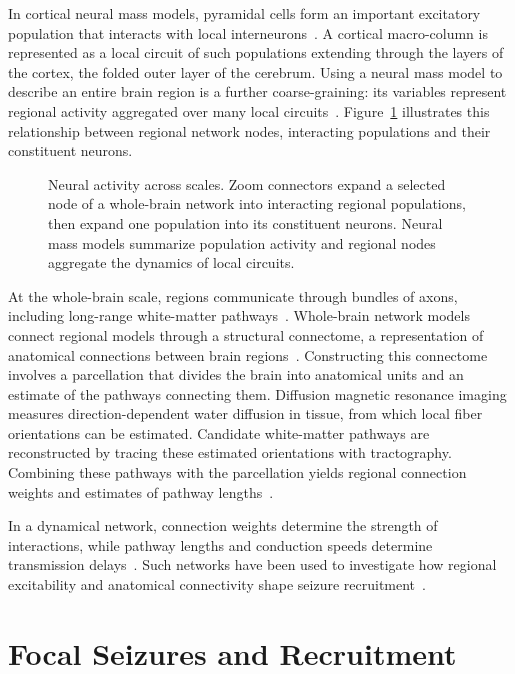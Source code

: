 In cortical neural mass models, pyramidal cells form an important excitatory population that interacts with local interneurons~\cite{Jansen1995}.
A cortical macro-column is represented as a local circuit of such populations extending through the layers of the cortex, the folded outer layer of the cerebrum.
Using a neural mass model to describe an entire brain region is a further coarse-graining: its variables represent regional activity aggregated over many local circuits~\cite{SanzLeon2013,SanzLeon2015}.
Figure~\ref{fig:neural_scales} illustrates this relationship between regional network nodes, interacting populations and their constituent neurons.

\begin{figure}
    \centering
    
    \caption{Neural activity across scales. Zoom connectors expand a selected node of a whole-brain network into interacting regional populations, then expand one population into its constituent neurons. Neural mass models summarize population activity and regional nodes aggregate the dynamics of local circuits.}\label{fig:neural_scales}
\end{figure}

At the whole-brain scale, regions communicate through bundles of axons, including long-range white-matter pathways~\cite{Hagmann2008}.
Whole-brain network models connect regional models through a structural connectome, a representation of anatomical connections between brain regions~\cite{SanzLeon2013}.
Constructing this connectome involves a parcellation that divides the brain into anatomical units and an estimate of the pathways connecting them.
Diffusion magnetic resonance imaging measures direction-dependent water diffusion in tissue, from which local fiber orientations can be estimated.
Candidate white-matter pathways are reconstructed by tracing these estimated orientations with tractography.
Combining these pathways with the parcellation yields regional connection weights and estimates of pathway lengths~\cite{Hagmann2008}.

In a dynamical network, connection weights determine the strength of interactions, while pathway lengths and conduction speeds determine transmission delays~\cite{SanzLeon2015}.
Such networks have been used to investigate how regional excitability and anatomical connectivity shape seizure recruitment~\cite{Olmi2019}.

\section{Focal Seizures and Recruitment}\label{sec:seizure_recruitment_background}

